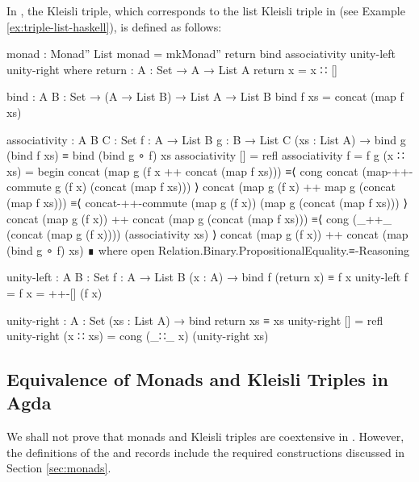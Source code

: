 \begin{example}
  \label{ex:triple-list-agda}

  In \agda, the  Kleisli triple, which corresponds to
  the list Kleisli triple in \hask (see Example
  \ref{ex:triple-list-haskell}), is defined as follows:
  \begin{codeagda}
monad : Monad'' List
monad = mkMonad'' return bind associativity unity-left unity-right
  where
    return : {A : Set} → A → List A
    return x = x ∷ []

    bind : {A B : Set} → (A → List B) → List A → List B
    bind f xs = concat (map f xs)

    associativity : {A B C : Set} {f : A → List B} {g : B → List C}
                    (xs : List A) →
                    bind g (bind f xs) ≡ bind (bind g ∘ f) xs
    associativity             []       = refl
    associativity {f = f} {g} (x ∷ xs) =
      begin
        concat (map g (f x ++ concat (map f xs)))
          ≡⟨ cong concat (map-++-commute g (f x)
               (concat (map f xs))) ⟩
        concat (map g (f x) ++ map g (concat (map f xs)))
          ≡⟨ concat-++-commute (map g (f x))
               (map g (concat (map f xs))) ⟩
        concat (map g (f x)) ++ concat (map g (concat (map f xs)))
          ≡⟨ cong (_++_ (concat (map g (f x)))) (associativity xs) ⟩
        concat (map g (f x)) ++ concat (map (bind g ∘ f) xs)
      ∎
        where open Relation.Binary.PropositionalEquality.≡-Reasoning

    unity-left : {A B : Set} {f : A → List B} (x : A) →
                 bind f (return x) ≡ f x
    unity-left {f = f} x = ++-[] (f x)

    unity-right : {A : Set} (xs : List A) → bind return xs ≡ xs
    unity-right []       = refl
    unity-right (x ∷ xs) = cong (_∷_ x) (unity-right xs)
  \end{codeagda}

\end{example}

\subsection{Equivalence of Monads and Kleisli Triples in Agda}

We shall not prove that monads and Kleisli triples are coextensive in
\agda. However, the definitions of the  and
 records include the required constructions
discussed in Section \ref{sec:monads}.

